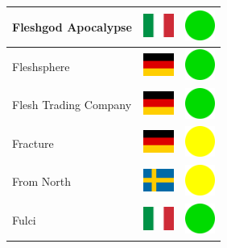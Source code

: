 \documentclass[12pt, a4paper, twoside]{report}
\begin{document}
\begin{center}
\begin{longtable}{|p{5cm}|p{2cm}|p{2cm}|}
Fleshgod Apocalypse & \includegraphics[width=1cm]{4x3/it} & \includegraphics[width=1cm]{likes/y} \\ \hline
Fleshsphere & \includegraphics[width=1cm]{4x3/de} & \includegraphics[width=1cm]{likes/y} \\ \hline
Flesh Trading Company & \includegraphics[width=1cm]{4x3/de} & \includegraphics[width=1cm]{likes/y} \\ \hline
Fracture & \includegraphics[width=1cm]{4x3/de} & \includegraphics[width=1cm]{likes/m} \\ \hline
From North & \includegraphics[width=1cm]{4x3/se} & \includegraphics[width=1cm]{likes/m} \\ \hline
Fulci & \includegraphics[width=1cm]{4x3/it} & \includegraphics[width=1cm]{likes/y} \\ \hline

\end{longtable}
\end{center}
\end{document}
